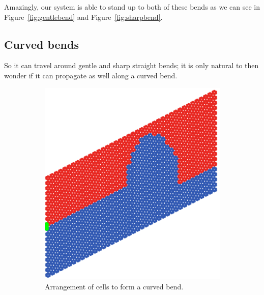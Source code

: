 Amazingly, our system is able to stand up to both of these bends as we can see
in Figure~\ref{fig:gentlebend} and Figure~\ref{fig:sharpbend}.


\subsection{Curved bends}
So it can travel around gentle and sharp straight bends; it is only natural to
then wonder if it can propagate as well along a curved bend.

\begin{figure}
\centering
\begin{subfigure}[b]{.5\textwidth}
  \centering
  \includegraphics[width=0.8\linewidth]{imgs/curvedbendarr.png}
  \caption{Arrangement of cells to form a curved bend.}
  \label{fig:sub1}
\end{subfigure}%
\begin{subfigure}[b]{.5\textwidth}
  \centering

\end{subfigure}
\end{figure}
